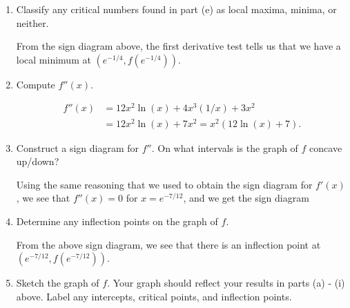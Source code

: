 \documentclass[12pt]{article}
\newcommand{\points}[1]{\marginpar{\hspace{24pt}[#1]}}
\begin{document}
\begin{enumerate}
\begin{enumerate}
  
  \item Classify any critical numbers found in part (e) as local maxima, minima, or neither. \points{1}
  
  \medskip
  
  From the sign diagram above, the first derivative test tells us that we have a local minimum at $(e^{-1/4},f(e^{-1/4}))$. 
  
  
  \item Compute $f''(x)$.\points{2}
  
\medskip

\begin{align*}
f''(x)&=12x^2\ln(x)+4x^3(1/x)+3x^2\\
& = 12x^2\ln(x)+7x^2 = x^2(12\ln(x)+7).
\end{align*}
  
  \item Construct a sign diagram for $f''$.  On what intervals is the graph of $f$ concave up/down? \points{2}
  
\medskip

Using the same reasoning that we used to obtain the sign diagram for $f'(x)$, we see that $f''(x)=0$ for $x=e^{-7/12}$, and we get the sign diagram
 \begin{center}
\end{center}
  
  \item Determine any inflection points on the graph of $f$. \points{1}
  
  \medskip
  
  From the above sign diagram, we see that there is an inflection point at $(e^{-7/12},f(e^{-7/12}))$. 
  
  \item Sketch the graph of $f$. Your graph should reflect your results in parts (a) - (i) above. Label any intercepts, critical points, and inflection points.\points{3}
  
  \medskip
  

\end{enumerate}
\end{enumerate}
\end{document}
